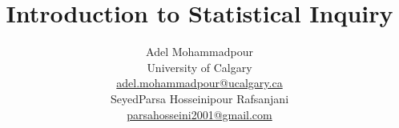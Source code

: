 


\title{Introduction to Statistical Inquiry \vspace*{18pt}}
\author{Adel Mohammadpour \\ University of Calgary \\ \url{adel.mohammadpour@ucalgary.ca} \vspace*{18pt} \\
SeyedParsa Hosseinipour Rafsanjani \\ \url{parsahosseini2001@gmail.com} \vspace*{36pt}}


 